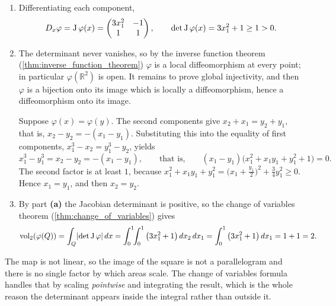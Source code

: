 \begin{exercisesolution}
\label{sol:cubic_shear_area}
\begin{enumerate}[label=\textbf{(\alph*)}]
  \item Differentiating each component,
\[D_x\varphi = \operatorname{J}\varphi(x) = \begin{pmatrix} 3x_1^2 & -1 \\ 1 & 1 \end{pmatrix},
  \qquad \det \operatorname{J}\varphi(x) = 3x_1^2 + 1 \ge 1 > 0 .\]

  \item The determinant never vanishes, so by the inverse function theorem
    (\cref{thm:inverse_function_theorem}) $\varphi$ is a local diffeomorphism at every point; in
    particular $\varphi(\mathbb{R}^2)$ is open. It remains to prove global injectivity, and then
    $\varphi$ is a bijection onto its image which is locally a diffeomorphism, hence a
    diffeomorphism onto its image.

    Suppose $\varphi(x) = \varphi(y)$. The second components give $x_2 + x_1 = y_2 + y_1$, that is,
    $x_2 - y_2 = -(x_1 - y_1)$. Substituting this into the equality of first components,
    $x_1^3 - x_2 = y_1^3 - y_2$, yields
\[x_1^3 - y_1^3 = x_2 - y_2 = -(x_1 - y_1),
  \qquad\text{that is,}\qquad (x_1 - y_1)\big(x_1^2 + x_1y_1 + y_1^2 + 1\big) = 0 .\]
    The second factor is at least $1$, because $x_1^2 + x_1y_1 + y_1^2 = \big(x_1 +
    \tfrac{y_1}{2}\big)^2 + \tfrac34 y_1^2 \ge 0$. Hence $x_1 = y_1$, and then $x_2 = y_2$.

  \item By part \textbf{(a)} the Jacobian determinant is positive, so the change of variables
    theorem (\cref{thm:change_of_variables}) gives
\[\operatorname{vol}_2(\varphi(Q)) = \int_Q \lvert\det \operatorname{J}\varphi\rvert \, dx
  = \int_0^1\!\!\int_0^1 \big(3x_1^2 + 1\big) \, dx_2\,dx_1
  = \int_0^1 \big(3x_1^2+1\big)\,dx_1 = 1 + 1 = 2 .\]
\end{enumerate}
\begin{remark}
The map is not linear, so the image of the square is not a parallelogram and there is no single
factor by which areas scale. The change of variables formula handles that by scaling
\emph{pointwise} and integrating the result, which is the whole reason the determinant appears
inside the integral rather than outside it.
\end{remark}
\end{exercisesolution}

